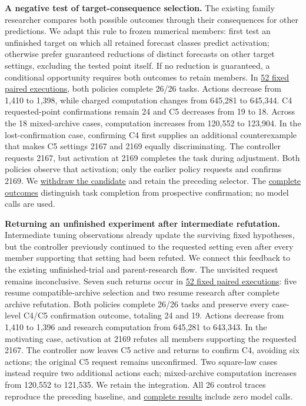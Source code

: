 \documentclass[twoside,11pt]{article}
\begin{document}
\textbf{A negative test of target-consequence selection.} The existing family researcher compares both possible outcomes through their consequences for other predictions. We adapt this rule to frozen numerical members: first test an unfinished target on which all retained forecast classes predict activation; otherwise prefer guaranteed reductions of distinct forecasts on other target settings, excluding the tested point itself. If no reduction is guaranteed, a conditional opportunity requires both outcomes to retain members. In \hyperlink{artifact-158}{52 fixed paired executions}, both policies complete 26/26 tasks. Actions decrease from 1,410 to 1,398, while charged computation changes from 645,281 to 645,344. C4 requested-point confirmations remain 24 and C5 decreases from 19 to 18. Across the 18 mixed-archive cases, computation increases from 120,552 to 123,904. In the lost-confirmation case, confirming C4 first supplies an additional counterexample that makes C5 settings 2167 and 2169 equally discriminating. The controller requests 2167, but activation at 2169 completes the task during adjustment. Both policies observe that activation; only the earlier policy requests and confirms 2169. We \hyperlink{artifact-159}{withdraw the candidate} and retain the preceding selector. The \hyperlink{artifact-160}{complete outcomes} distinguish task completion from prospective confirmation; no model calls are used.


\textbf{Returning an unfinished experiment after intermediate refutation.} Intermediate tuning observations already update the surviving fixed hypotheses, but the controller previously continued to the requested setting even after every member supporting that setting had been refuted. We connect this feedback to the existing unfinished-trial and parent-research flow. The unvisited request remains inconclusive. Seven such returns occur in \hyperlink{artifact-161}{52 fixed paired executions}: five resume compatible-archive selection and two resume research after complete archive refutation. Both policies complete 26/26 tasks and preserve every case-level C4/C5 confirmation outcome, totaling 24 and 19. Actions decrease from 1,410 to 1,396 and research computation from 645,281 to 643,343. In the motivating case, activation at 2169 refutes all members supporting the requested 2167. The controller now leaves C5 active and returns to confirm C4, avoiding six actions; the original C5 request remains unconfirmed. Two square-law cases instead require two additional actions each; mixed-archive computation increases from 120,552 to 121,535. We retain the integration. All 26 control traces reproduce the preceding baseline, and \hyperlink{artifact-162}{complete results} include zero model calls.
\end{document}
